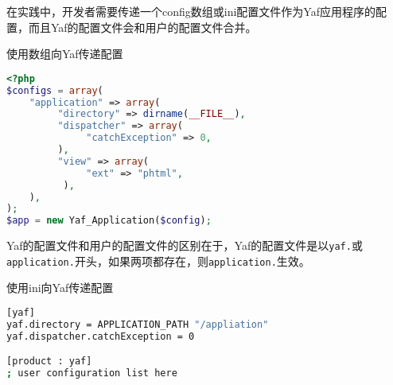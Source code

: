 在实践中，开发者需要传递一个config数组或ini配置文件作为Yaf应用程序的配置，而且Yaf的配置文件会和用户的配置文件合并。

\begin{example}
使用数组向Yaf传递配置
\begin{lstlisting}[language=PHP]
<?php
$configs = array(
    "application" => array(
         "directory" => dirname(__FILE__),
         "dispatcher" => array(
              "catchException" => 0,
         ),
         "view" => array(
              "ext" => "phtml",
          ),
    ),
);
$app = new Yaf_Application($config);
\end{lstlisting}
\end{example}

Yaf的配置文件和用户的配置文件的区别在于，Yaf的配置文件是以\texttt{yaf.}或\texttt{application.}开头，如果两项都存在，则\texttt{application.}生效。

\begin{example}
使用ini向Yaf传递配置
\begin{lstlisting}[language=bash]
[yaf]
yaf.directory = APPLICATION_PATH "/appliation"
yaf.dispatcher.catchException = 0

[product : yaf]
; user configuration list here
\end{lstlisting}
\end{example}


